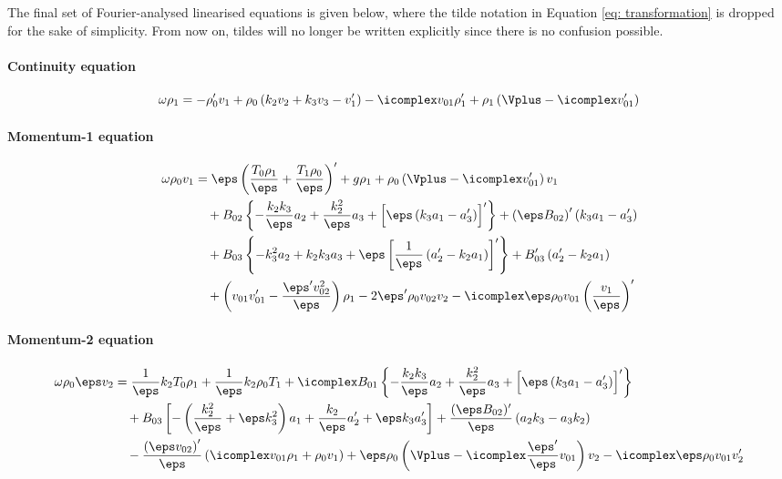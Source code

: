 The final set of Fourier-analysed linearised equations is given below, where the tilde notation in Equation \eqref{eq: transformation} is dropped for the sake of simplicity. From now on, tildes will no longer be written explicitly since there is no confusion possible.

\paragraph{Continuity equation}
\begin{equation} \label{eq: full_continuity}
  \omega\rho_1 =
    -\rho_0' v_1 + \rho_0\left(k_2 v_2 + k_3 v_3 - v_1'\right)
    -\icomplex v_{01}\rho_1' + \rho_1 \left(\Vplus - \icomplex v_{01}'\right)
\end{equation}

\paragraph{Momentum-1 equation}
\begin{equation}
  \begin{aligned}
  \omega\rho_0 v_1  &=
    \eps\left(\frac{T_0 \rho_1}{\eps} + \frac{T_1 \rho_0}{\eps}\right)'
    + g \rho_1
    + \rho_0 \left(\Vplus - \icomplex v_{01}'\right)v_1 \\
    &\quad
		+ B_{02} \left\{
      - \frac{k_2 k_3}{\eps}a_2 + \frac{k_2^2}{\eps}a_3 + \Bigl[\eps\left(k_3a_1 - a_3'\right)\Bigr]'
    \right\}
    + \left(\eps B_{02}\right)'\left(k_3a_1 - a_3'\right)  \\
    &\quad
    + B_{03} \left\{
      -k_3^2 a_2 + k_2 k_3a_3 + \eps\left[\frac{1}{\eps}\left(a_2' - k_2 a_1 \right)\right]'
    \right\}
    + B_{03}' \left(a_2' - k_2a_1\right) \\
    &\quad
    + \left(v_{01} v_{01}' - \frac{\eps' v_{02}^2}{\eps}\right)\rho_1
		- 2 \eps' \rho_0 v_{02} v_2
    - \icomplex \eps\rho_0 v_{01} \left(\frac{v_1}{\eps}\right)'
  \end{aligned}
\end{equation}

\paragraph{Momentum-2 equation}
\begin{equation}
  \begin{aligned}
  \omega\rho_0 \eps v_2 &=
    \frac{1}{\eps} k_2 T_0 \rho_1
    + \frac{1}{\eps}k_2 \rho_0 T_1
    + \icomplex B_{01} \left\{
      -\frac{k_2 k_3}{\eps}a_2  + \frac{k_2^2}{\eps}a_3 + \Bigl[\eps\left(k_3 a_1  - a_3'\right)\Bigr]'
    \right\} \\
    &\quad
    + B_{03} \left[- \left(\frac{k_2^2}{\eps} + \eps k_3^2\right)a_1  + \frac{ k_2}{\eps}a_2' +  \eps k_3a_3'\right]
    + \frac{(\eps B_{02})'}{\eps}\left(a_2 k_3 - a_3 k_2\right) \\
    &\quad
    - \frac{\left(\eps v_{02}\right)'}{\eps} \left(\icomplex v_{01} \rho_1 + \rho_0 v_1\right)
    + \eps\rho_0 \left(\Vplus - \icomplex \frac{\eps'}{\eps} v_{01}\right)v_2
    - \icomplex \eps \rho_0 v_{01} v_2'
  \end{aligned}
\end{equation}

